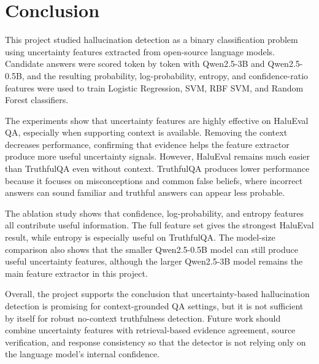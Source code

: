 \documentclass[11pt]{article}
\begin{document}
\section{Conclusion}
This project studied hallucination detection as a binary classification problem using uncertainty features extracted from open-source language models. Candidate answers were scored token by token with Qwen2.5-3B and Qwen2.5-0.5B, and the resulting probability, log-probability, entropy, and confidence-ratio features were used to train Logistic Regression, SVM, RBF SVM, and Random Forest classifiers.

The experiments show that uncertainty features are highly effective on HaluEval QA, especially when supporting context is available. Removing the context decreases performance, confirming that evidence helps the feature extractor produce more useful uncertainty signals. However, HaluEval remains much easier than TruthfulQA even without context. TruthfulQA produces lower performance because it focuses on misconceptions and common false beliefs, where incorrect answers can sound familiar and truthful answers can appear less probable.

The ablation study shows that confidence, log-probability, and entropy features all contribute useful information. The full feature set gives the strongest HaluEval result, while entropy is especially useful on TruthfulQA. The model-size comparison also shows that the smaller Qwen2.5-0.5B model can still produce useful uncertainty features, although the larger Qwen2.5-3B model remains the main feature extractor in this project.

Overall, the project supports the conclusion that uncertainty-based hallucination detection is promising for context-grounded QA settings, but it is not sufficient by itself for robust no-context truthfulness detection. Future work should combine uncertainty features with retrieval-based evidence agreement, source verification, and response consistency so that the detector is not relying only on the language model's internal confidence.

\newpage



\end{document}
